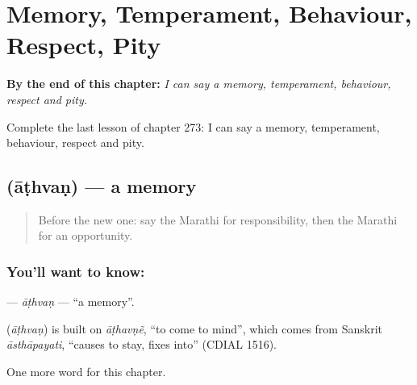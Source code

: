 
\chapter{Memory, Temperament, Behaviour, Respect, Pity}
\label{ch:mr-memory-temperament-behaviour-respect-pity}

\begin{chapteropening}
\textbf{By the end of this chapter:} \emph{I can say a memory, temperament, behaviour, respect and pity.}

Complete the last lesson of chapter 273: I can say a memory, temperament, behaviour, respect and pity.
\end{chapteropening}

\section[\texorpdfstring{\mr{आठवण} (āṭhvaṇ)}{आठवण (āṭhvaṇ)}]{ (āṭhvaṇ) — a memory}

\label{lesson:MR-C273-athvan}



\begin{quote}
Before the new one: say the Marathi for responsibility, then the Marathi for an opportunity.
\end{quote}

\subsection*{You'll want to know: }
\textbf{} — \emph{āṭhvaṇ} — \textquotedblleft{}a memory\textquotedblright{}.

\begin{cousinweb}
\textbf{} (\emph{āṭhvaṇ}) is built on \emph{āṭhavṇẽ}, \textquotedblleft{}to come to mind\textquotedblright{}, which comes from Sanskrit \emph{āsthāpayati}, \textquotedblleft{}causes to stay, fixes into\textquotedblright{} (CDIAL 1516).
\end{cousinweb}

\begin{grammarlens}[title={What you've built}]
One more word for this chapter.
\end{grammarlens}

